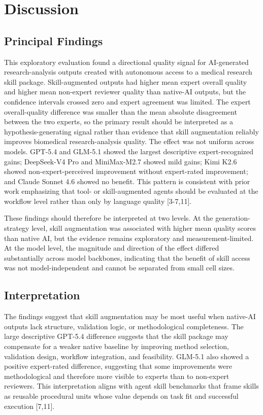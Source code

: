 \documentclass[11pt]{article}
\begin{document}
\section{Discussion}

\subsection{Principal Findings}

This exploratory evaluation found a directional quality signal for AI-generated research-analysis outputs created with autonomous access to a medical research skill package. Skill-augmented outputs had higher mean expert overall quality and higher mean non-expert reviewer quality than native-AI outputs, but the confidence intervals crossed zero and expert agreement was limited. The expert overall-quality difference was smaller than the mean absolute disagreement between the two experts, so the primary result should be interpreted as a hypothesis-generating signal rather than evidence that skill augmentation reliably improves biomedical research-analysis quality. The effect was not uniform across models. GPT-5.4 and GLM-5.1 showed the largest descriptive expert-recognized gains; DeepSeek-V4 Pro and MiniMax-M2.7 showed mild gains; Kimi K2.6 showed non-expert-perceived improvement without expert-rated improvement; and Claude Sonnet 4.6 showed no benefit. This pattern is consistent with prior work emphasizing that tool- or skill-augmented agents should be evaluated at the workflow level rather than only by language quality [3-7,11].

These findings should therefore be interpreted at two levels. At the generation-strategy level, skill augmentation was associated with higher mean quality scores than native AI, but the evidence remains exploratory and measurement-limited. At the model level, the magnitude and direction of the effect differed substantially across model backbones, indicating that the benefit of skill access was not model-independent and cannot be separated from small cell sizes.

\subsection{Interpretation}

The findings suggest that skill augmentation may be most useful when native-AI outputs lack structure, validation logic, or methodological completeness. The large descriptive GPT-5.4 difference suggests that the skill package may compensate for a weaker native baseline by improving method selection, validation design, workflow integration, and feasibility. GLM-5.1 also showed a positive expert-rated difference, suggesting that some improvements were methodological and therefore more visible to experts than to non-expert reviewers. This interpretation aligns with agent skill benchmarks that frame skills as reusable procedural units whose value depends on task fit and successful execution [7,11].
\end{document}
